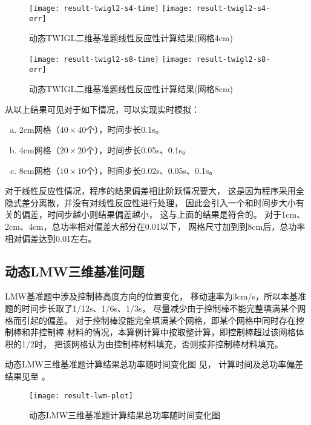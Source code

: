 \begin{figure}[H]
\centering
\texttt{[image: result-twigl2-s4-time]}
\texttt{[image: result-twigl2-s4-err]}
\caption{动态TWIGL二维基准题线性反应性计算结果(网格4cm)\label{fig:testresult.twigl.2.4}}
\end{figure}

\begin{figure}[H]
\centering
\texttt{[image: result-twigl2-s8-time]}
\texttt{[image: result-twigl2-s8-err]}
\caption{动态TWIGL二维基准题线性反应性计算结果(网格8cm)\label{fig:testresult.twigl.2.8}}
\end{figure}

从以上结果可见对于如下情况，可以实现实时模拟：
\begin{enumerate}[a)]
\item 2cm网格（$40\times40$个），时间步长0.1s。
\item 4cm网格（$20\times20$个），时间步长0.05s、0.1s。
\item 8cm网格（$10\times10$个），时间步长0.02s、0.05s、0.1s。
\end{enumerate}

对于线性反应性情况，\ProgramName 程序的结果偏差相比阶跃情况要大，
这是因为\ProgramName 程序采用全隐式差分离散，并没有对线性反应性进行处理，
因此会引入一个和时间步大小有关的偏差，时间步越小则结果偏差越小，
这与上面的结果是符合的。
对于1cm、2cm、4cm，总功率相对偏差大部分在0.01以下，
网格尺寸加到到8cm后，总功率相对偏差达到0.01左右。


\subsection{动态LMW三维基准问题}

LMW基准题中涉及控制棒高度方向的位置变化，
移动速率为3cm/s，所以本基准题的时间步长取了1/12s、1/6s、1/3s，
尽量减少由于控制棒不能完整填满某个网格而引起的偏差。
对于控制棒没能完全填满某个网格，即某个网格中同时存在控制棒和非控制棒
材料的情况，本算例计算中按取整计算，即控制棒超过该网格体积的1/2时，
把该网格认为由控制棒材料填充，否则按非控制棒材料填充。

动态LMW三维基准题计算结果总功率随时间变化图
见，
计算时间及总功率偏差结果见至
。

\begin{figure}[H]
\centering
\texttt{[image: result-lwm-plot]}
\caption{动态LMW三维基准题计算结果总功率随时间变化图\label{fig:testresult.lwm.plot}}
\end{figure}

